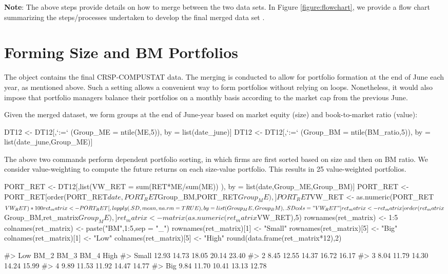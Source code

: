 {\color{black}
\noindent \textbf{Note}: The above steps provide details on how to merge between the two data sets. In Figure \ref{figure:flowchart}, we provide a flow chart summarizing the steps/processes undertaken to develop the final merged data set .
}


\hypertarget{forming-size-and-bm-portfolios}{
\section{Forming Size and BM
Portfolios}
\label{forming-size-and-bm-portfolios}
}

The  object contains the final CRSP-COMPUSTAT data. The
merging is conducted to allow for portfolio formation at the end of June
each year, as mentioned above. Such a setting allows a convenient way to form
portfolios without relying on loops. Nonetheless, it
would also impose that portfolio managers balance their portfolios on a
monthly basis according to the market cap from the previous June.

Given the merged dataset, we form groups at the end of June-year based
on market equity (size) and book-to-market ratio (value):

\begin{Schunk}
\begin{Sinput}
DT12 <- DT12[,`:=` (Group_ME = ntile(ME,5)), by = list(date_june)]
DT12 <- DT12[,`:=` (Group_BM = ntile(BM_ratio,5)), by = list(date_june,Group_ME)]
\end{Sinput}
\end{Schunk}
The above two commands perform dependent portfolio sorting, in which 
firms are first sorted based on size and then on BM ratio. We
consider value-weighting to compute the future returns on each
size-value portfolio. This results in 25 value-weighted portfolios.

\begin{Schunk}
\begin{Sinput}
PORT_RET <- DT12[,list(VW_RET = sum(RET*ME/sum(ME))  ),
                 by = list(date,Group_ME,Group_BM)]
PORT_RET <- PORT_RET[order(PORT_RET$date,PORT_RET$Group_BM,PORT_RET$Group_ME),]
PORT_RET$VW_RET <- as.numeric(PORT_RET$VW_RET)*100

ret_matrix <- PORT_RET[,lapply(.SD,mean,na.rm = TRUE),
                       by = list(Group_ME,Group_BM), .SDcols = "VW_RET"]
ret_matrix <- ret_matrix[order(ret_matrix$Group_BM,ret_matrix$Group_ME),]
ret_matrix <- matrix(as.numeric(ret_matrix$VW_RET),5)
rownames(ret_matrix) <- 1:5
colnames(ret_matrix) <- paste("BM",1:5,sep = "_")
rownames(ret_matrix)[1] <- "Small"
rownames(ret_matrix)[5] <- "Big"
colnames(ret_matrix)[1] <- "Low"
colnames(ret_matrix)[5] <- "High"
round(data.frame(ret_matrix*12),2)
\end{Sinput}
\begin{Soutput}
#>         Low  BM_2  BM_3  BM_4  High
#> Small 12.93 14.73 18.05 20.14 23.40
#> 2      8.45 12.55 14.37 16.72 16.17
#> 3      8.04 11.79 14.30 14.24 15.99
#> 4      9.89 11.53 11.92 14.47 14.77
#> Big    9.84 11.70 10.41 13.13 12.78
\end{Soutput}
\end{Schunk}

